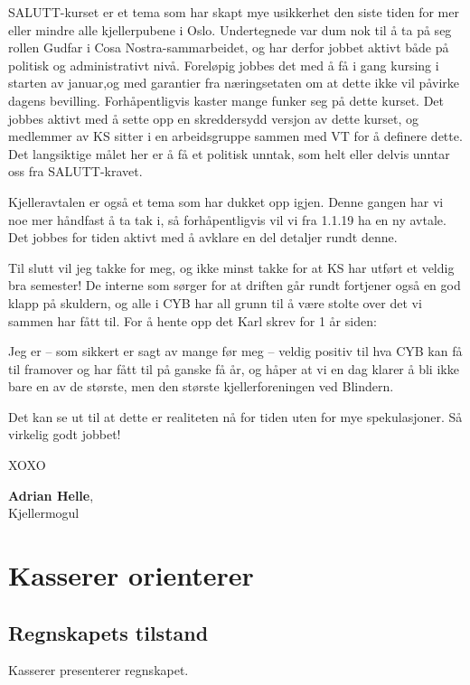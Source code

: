 \documentclass[10pt,norsk,a4paper]{article}
\begin{document}
\begin{multicols}{2}
SALUTT-kurset er et tema som har skapt mye usikkerhet den siste tiden for mer eller mindre alle kjellerpubene i Oslo.
Undertegnede var dum nok til å ta på seg rollen Gudfar i Cosa Nostra-sammarbeidet, og har derfor jobbet aktivt både på politisk og administrativt nivå.
Foreløpig jobbes det med å få i gang kursing i starten av januar,og med garantier fra næringsetaten om at dette ikke vil påvirke dagens bevilling.
Forhåpentligvis kaster mange funker seg på dette kurset.
Det jobbes aktivt med å sette opp en skreddersydd versjon av dette kurset,
og medlemmer av KS sitter i en arbeidsgruppe sammen med VT for å definere dette.
Det langsiktige målet her er å få et politisk unntak, som helt eller delvis unntar oss fra SALUTT-kravet.

Kjelleravtalen er også et tema som har dukket opp igjen.
Denne gangen har vi noe mer håndfast å ta tak i, så forhåpentligvis vil vi fra 1.1.19 ha en ny avtale.
Det jobbes for tiden aktivt med å avklare en del detaljer rundt denne.

Til slutt vil jeg takke for meg, og ikke minst takke for at KS har utført et veldig bra semester!
De interne som sørger for at driften går rundt fortjener også en god klapp på skuldern,
og alle i CYB har all grunn til å være stolte over det vi sammen har fått til.
For å hente opp det Karl skrev for 1 år siden:
\begin{blockquote}
Jeg er – som sikkert er sagt av mange før meg – veldig positiv til hva CYB kan få til framover og har fått til på ganske få år, og håper at vi en dag klarer å bli ikke bare en av de største, men den største kjellerforeningen ved Blindern.
\end{blockquote}
Det kan se ut til at dette er realiteten nå for tiden uten for mye spekulasjoner.
Så virkelig godt jobbet!
\end{multicols}

XOXO

\textbf{Adrian Helle}, \\
Kjellermogul \\
\date{14.\ november 2018}



\section{Kasserer orienterer}
\subsection{Regnskapets tilstand}
Kasserer presenterer regnskapet.
\end{document}
